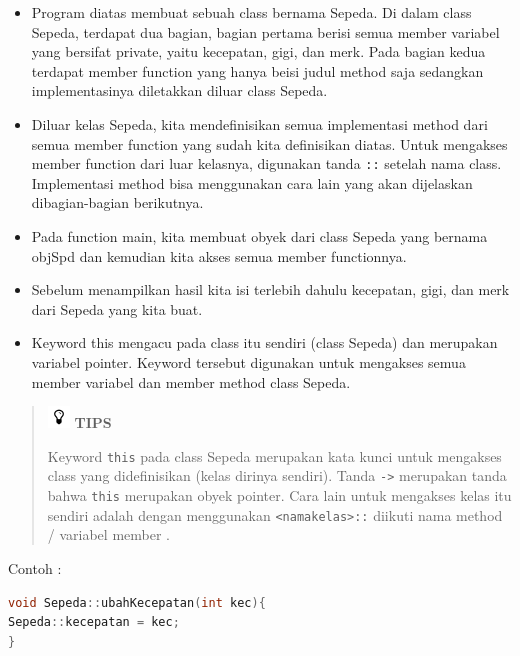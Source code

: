 \begin{itemize}

\item
  Program diatas membuat sebuah class bernama Sepeda. Di dalam class
  Sepeda, terdapat dua bagian, bagian pertama berisi semua member
  variabel yang bersifat private, yaitu kecepatan, gigi, dan merk. Pada
  bagian kedua terdapat member function yang hanya beisi judul method
  saja sedangkan implementasinya diletakkan diluar class Sepeda.
\item
  Diluar kelas Sepeda, kita mendefinisikan semua implementasi method
  dari semua member function yang sudah kita definisikan diatas. Untuk
  mengakses member function dari luar kelasnya, digunakan tanda
  \texttt{::} setelah nama class. Implementasi method bisa menggunakan
  cara lain yang akan dijelaskan dibagian-bagian berikutnya.
\item
  Pada function main, kita membuat obyek dari class Sepeda yang bernama
  objSpd dan kemudian kita akses semua member functionnya.
\item
  Sebelum menampilkan hasil kita isi terlebih dahulu kecepatan, gigi,
  dan merk dari Sepeda yang kita buat.
\item
  Keyword this mengacu pada class itu sendiri (class Sepeda) dan
  merupakan variabel pointer. Keyword tersebut digunakan untuk mengakses
  semua member variabel dan member method class Sepeda.
\end{itemize}
\begin{quotation}
\includegraphics{../manuscript/images/tips}	\textbf{TIPS} 
	
	Keyword
	\texttt{this} pada class Sepeda merupakan kata kunci untuk mengakses
	class yang didefinisikan (kelas dirinya sendiri). Tanda
	\texttt{-\textgreater{}} merupakan tanda bahwa \texttt{this} merupakan
	obyek pointer. Cara lain untuk mengakses kelas itu sendiri adalah dengan
	menggunakan \texttt{\textless{}namakelas\textgreater{}::} diikuti nama
	method / variabel member .
\end{quotation}
 
 
  

Contoh :

\begin{lstlisting}[language=c++, numbers=none]
void Sepeda::ubahKecepatan(int kec){
Sepeda::kecepatan = kec;
}
\end{lstlisting}

